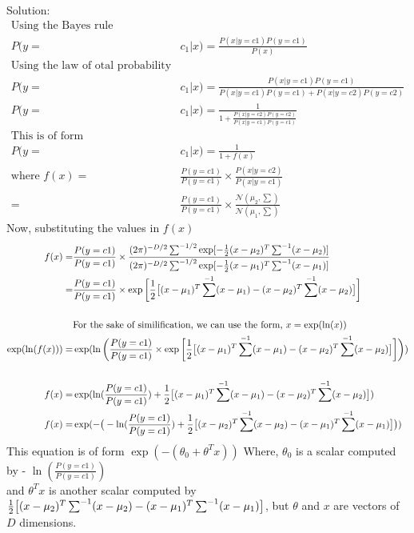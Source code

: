 \documentclass[letterpaper,doc,notimes]{apa6}
\begin{document}
{\noindent Solution:
\begin{align*}
\text{Using the Bayes rule} & \\
	P(y =& c_1|x) = \frac{P(x | y=c1) P(y=c1)}{P(x)} \\
\text{Using the law of otal probability} \\
	P(y =& c_1|x) = \frac{P(x | y=c1) P(y=c1)}{P(x | y=c1) P(y=c1) + P(x | y=c2) P(y=c2)} \\
	P(y =& c_1|x) = \frac{1}{1 + \frac{ P(x | y=c2) P(y=c2)}{P(x | y=c1) P(y=c1)} } \\
\text{This is of form} \\
	P(y =& c_1|x) = \frac{1}{1 + f(x)} \\
\text{where } f(x) = & \frac{P(y=c1)}{P(y=c1)} \times \frac{P(x|y=c2) }{P(x|y=c1)} \\
	 = & \frac{P(y=c1)}{P(y=c1)} \times \frac{\mathcal{N}(\mu_2, \sum) }{\mathcal{N}(\mu_1, \sum)}
\end{align*}
Now, substituting the values in $f(x)$
\begin{align*}
f(x) = & \frac{P(y=c1)}{P(y=c1)} \times \frac{(2\pi)^{-D/2} \sum^{-1/2} \exp[-\frac{1}{2} (x-\mu_2)^T \space \sum^{-1} \space (x-\mu_2)] }  {(2\pi)^{-D/2} \sum^{-1/2} \exp[-\frac{1}{2} (x-\mu_1)^T \space \sum^{-1} \space (x-\mu_1)]}\\ 
  = & \frac{P(y=c1)}{P(y=c1)} \times \exp \bigg[\frac{1}{2}  \big[(x-\mu_1)^T \space \sum^{-1} \space (x-\mu_1) - (x-\mu_2)^T \space \sum^{-1} \space (x-\mu_2)  \big] \bigg] \\
  \\ 
&  \text{For the sake of similification, we can use the form, } x = \exp(\ln(x))\\ 
\exp(\ln(f(x))) = &\exp(\ln\bigg( \frac{P(y=c1)}{P(y=c1)} \times \exp \bigg[\frac{1}{2}  \big[(x-\mu_1)^T \space \sum^{-1} \space (x-\mu_1) - (x-\mu_2)^T \space \sum^{-1} \space (x-\mu_2)  \big] \bigg] \bigg)) \\
\\
f(x) = &\exp(\ln(\frac{P(y=c1)}{P(y=c1)}) + \frac{1}{2} \big[(x-\mu_1)^T \space \sum^{-1} \space (x-\mu_1) - (x-\mu_2)^T \space \sum^{-1} \space (x-\mu_2)  \big] ) \\
f(x) = &\exp( - \big(- \ln(\frac{P(y=c1)}{P(y=c1)}) + \frac{1}{2} \big[ (x-\mu_2)^T \space \sum^{-1} \space (x-\mu_2) - (x-\mu_1)^T \space \sum^{-1} \space (x-\mu_1)\big] \big)) \\
\end{align*}
This equation is of  form $\exp(-(\theta_0 + {\theta}^Tx))$
Where, $\theta_0$ is a scalar computed by - $\ln(\frac{P(y=c1)}{P(y=c1)}) $ \\
 and $\theta^Tx$ is another scalar computed by $\frac{1}{2} \big[(x-\mu_2)^T \space \sum^{-1} \space (x-\mu_2) - (x-\mu_1)^T \space \sum^{-1} \space (x-\mu_1)  \big]$, but $\theta$ and $x$ are vectors of $D$ dimensions.
 
}
\end{document}

